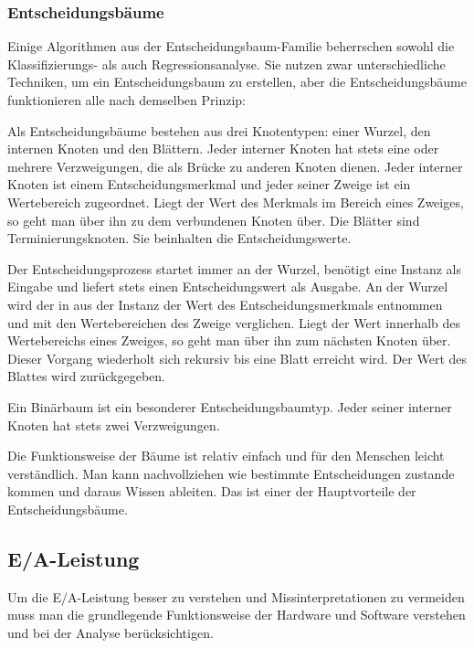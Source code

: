 \subsubsection{Entscheidungsbäume}
Einige Algorithmen aus der Entscheidungsbaum-Familie beherrschen sowohl die Klassifizierungs- als auch Regressionsanalyse. 
Sie nutzen zwar unterschiedliche Techniken, um ein Entscheidungsbaum zu erstellen, aber die Entscheidungsbäume funktionieren alle nach demselben Prinzip: 

Als Entscheidungsbäume bestehen aus drei Knotentypen: einer Wurzel, den internen Knoten und den Blättern. 
Jeder interner Knoten hat stets eine oder mehrere Verzweigungen, die als Brücke zu anderen Knoten dienen. 
Jeder interner Knoten ist einem Entscheidungsmerkmal und jeder seiner Zweige ist ein Wertebereich zugeordnet. 
Liegt der Wert des Merkmals im Bereich eines Zweiges, so geht man über ihn zu dem verbundenen Knoten über. 
Die Blätter sind Terminierungsknoten. 
Sie beinhalten die Entscheidungswerte. 

Der Entscheidungsprozess startet immer an der Wurzel, benötigt eine Instanz als Eingabe und liefert stets einen Entscheidungswert als Ausgabe. 
An der Wurzel wird der in aus der Instanz der Wert des Entscheidungsmerkmals entnommen und mit den Wertebereichen des Zweige verglichen. 
Liegt der Wert innerhalb des Wertebereichs eines Zweiges, so geht man über ihn zum nächsten Knoten über. 
Dieser Vorgang wiederholt sich rekursiv bis eine Blatt erreicht wird. Der Wert des Blattes wird zurückgegeben. 

Ein Binärbaum ist ein besonderer Entscheidungsbaumtyp. 
Jeder seiner interner Knoten hat stets zwei Verzweigungen. 

Die Funktionsweise der Bäume ist relativ einfach und für den Menschen leicht verständlich. 
Man kann nachvollziehen wie bestimmte Entscheidungen zustande kommen und daraus Wissen ableiten. 
Das ist einer der Hauptvorteile der Entscheidungsbäume.




\subsection{E/A-Leistung}
Um die E/A-Leistung besser zu verstehen und Missinterpretationen zu vermeiden muss man die grundlegende Funktionsweise der Hardware und Software verstehen und bei der Analyse berücksichtigen. 

